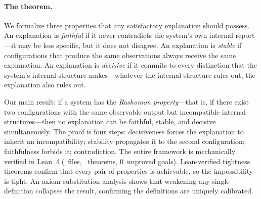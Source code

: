 \documentclass[11pt]{article}
\begin{document}
\paragraph{The theorem.}
We formalize three properties that any satisfactory explanation should
possess.  An explanation is \emph{faithful} if it never contradicts the
system's own internal report---it may be less specific, but it does not
disagree.  An explanation is \emph{stable} if configurations that produce
the same observations always receive the same explanation.  An explanation
is \emph{decisive} if it commits to every distinction that the system's
internal structure makes---whatever the internal structure rules out, the
explanation also rules out.

Our main result: if a system has the \emph{Rashomon property}---that is, if
there exist two configurations with the same observable output but
incompatible internal structures---then no explanation can be faithful,
stable, and decisive simultaneously.  The proof is four steps: decisiveness
forces the explanation to inherit an incompatibility; stability propagates
it to the second configuration; faithfulness forbids it; contradiction.
The entire framework is mechanically verified in Lean~4
\citep{demoura2021lean4} (\ClaimMainFiles~files, \ClaimMainTheorems~theorems, 0~unproved goals).
Lean-verified tightness theorems confirm that every pair of properties is
achievable, so the impossibility is tight.  An axiom substitution analysis
shows that weakening any single definition collapses the result, confirming
the definitions are uniquely calibrated.
\end{document}
